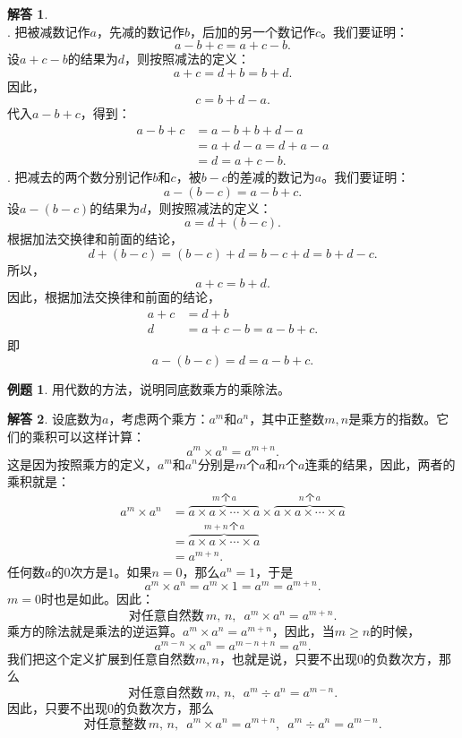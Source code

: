\documentclass[12pt,UTF8]{ctexbook}
\theoremstyle{definition}
\newtheorem{et}{例题}[section]
\newtheorem*{so}{解答}
\theoremstyle{plain}
\begin{document}
\begin{so}
    \mbox{} \\
    . 把被减数记作$a$，先减的数记作$b$，后加的另一个数记作$c$。我们要证明：
    $$ a - b + c = a + c - b.$$
    设$a + c - b$的结果为$d$，则按照减法的定义：
    $$ a + c = d + b = b + d.$$
    因此，
    $$ c = b + d - a.$$
    代入$a - b + c$，得到：
    \begin{align*}
        a - b + c &= a - b + b + d - a \\
        &= a + d - a = d + a - a \tag{加法交换律} \\
        &= d = a + c - b.
    \end{align*}
    . 把减去的两个数分别记作$b$和$c$，被$b-c$的差减的数记为$a$。我们要证明：
    $$ a - (b - c) = a - b + c.$$
    设$a - (b - c)$的结果为$d$，则按照减法的定义：
    $$ a = d + (b - c).$$
    根据加法交换律和前面的结论，
    $$ d + (b - c) = (b - c) + d = b - c + d = b + d - c.$$
    所以，
    $$ a + c = b + d.$$
    因此，根据加法交换律和前面的结论，
    \begin{align*}
        a + c &= d + b \\
        d &= a + c - b = a - b + c.
    \end{align*}
    即
    $$ a - (b - c) = d = a - b + c.$$
\end{so}

\begin{et}
    用代数的方法，说明同底数乘方的乘除法。
\end{et}

\begin{so}
    设底数为$a$，考虑两个乘方：$a^m$和$a^n$，其中正整数$m,n$是乘方的指数。它们的乘积可以这样计算：
    $$ a^m \times a^n = a^{m+n}. $$
    这是因为按照乘方的定义，$a^m$和$a^n$分别是$m$个$a$和$n$个$a$连乘的结果，因此，两者的乘积就是：
    \begin{align*}
        a^m \times a^n &= \overbrace{a\times a\times \cdots \times a}^{m\,\text{个}\,a} \times \overbrace{a\times a\times \cdots \times a}^{n\,\text{个}\,a} \\
        &= \overbrace{a\times a\times \cdots \times a}^{m+n\,\text{个}\,a} \\
        &= a^{m+n}.
    \end{align*}
    任何数$a$的$0$次方是$1$。如果$n=0$，那么$a^n=1$，于是
    $$ a^m \times a^n = a^{m}\times 1 = a^m = a^{m+n}. $$
    $m=0$时也是如此。因此：
    $$ \mbox{对任意自然数}\,m,\, n, \,\,\, a^m \times a^n = a^{m+n}. $$
    乘方的除法就是乘法的逆运算。$ a^m \times a^n = a^{m+n}$，因此，当$m\geqslant n$的时候，
    $$ a^{m-n} \times a^n = a^{m-n+n} = a^m. $$
    我们把这个定义扩展到任意自然数$m,n$，也就是说，只要不出现$0$的负数次方，那么
    $$  \mbox{对任意自然数}\,m,\, n, \,\,\, a^m \div a^n = a^{m-n}. $$
    因此，只要不出现$0$的负数次方，那么
    $$  \mbox{对任意整数}\,m,\, n, \,\,\, a^m \times a^n = a^{m+n}, \,\,\, a^m \div a^n = a^{m-n}. $$
\end{so}
\end{document}
